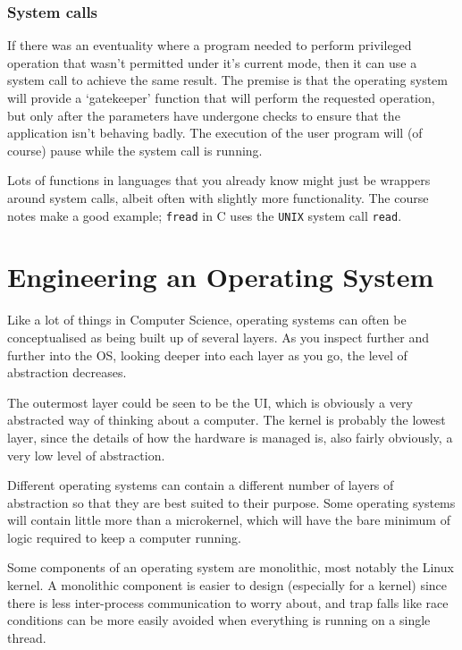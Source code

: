 \subsubsection{System calls}

If there was an eventuality where a program needed to perform privileged
operation that wasn't permitted under it's current mode, then it can use a
system call to achieve the same result. The premise is that the operating
system will provide a `gatekeeper' function that will perform the requested
operation, but only after the parameters have undergone checks to ensure that
the application isn't behaving badly. The execution of the user program will
(of course) pause while the system call is running.

Lots of functions in languages that you already know might just be wrappers
around system calls, albeit often with slightly more functionality. The course
notes make a good example; \texttt{fread} in C uses the \texttt{UNIX} system
call \texttt{read}.

\section{Engineering an Operating System}

Like a lot of things in Computer Science, operating systems can often be
conceptualised as being built up of several layers. As you inspect further and
further into the OS, looking deeper into each layer as you go, the level of
abstraction decreases.

The outermost layer could be seen to be the UI, which is obviously a very
abstracted way of thinking about a computer. The kernel is probably the lowest
layer, since the details of how the hardware is managed is, also fairly
obviously, a very low level of abstraction.

Different operating systems can contain a different number of layers of
abstraction so that they are best suited to their purpose. Some operating
systems will contain little more than a microkernel, which will have the bare
minimum of logic required to keep a computer running.

Some components of an operating system are monolithic, most notably the Linux
kernel. A monolithic component is easier to design (especially for a kernel)
since there is less inter-process communication to worry about, and trap falls
like race conditions can be more easily avoided when everything is running on
a single thread.

